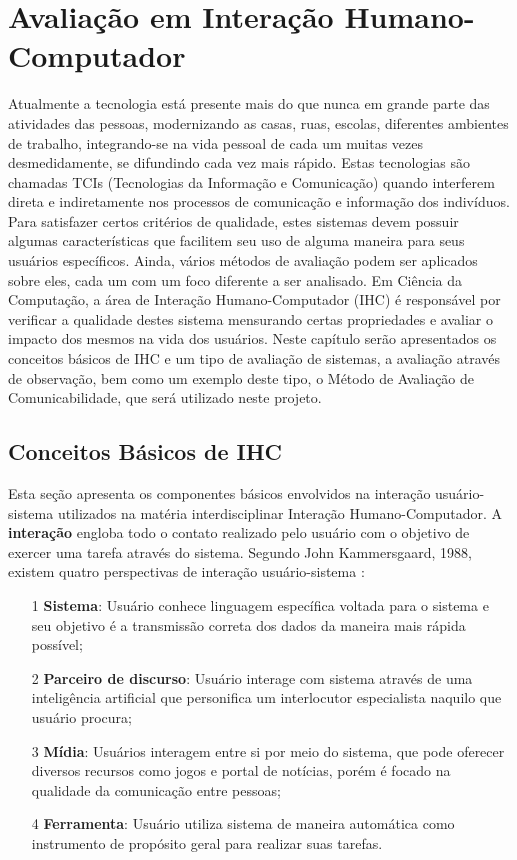 \chapter{Avaliação em Interação Humano-Computador}

\indent Atualmente a tecnologia está presente mais do que nunca em grande parte das atividades das pessoas, modernizando as casas, ruas, escolas, diferentes ambientes de trabalho, integrando-se na vida pessoal de cada um muitas vezes desmedidamente, se difundindo cada vez mais rápido. Estas tecnologias são chamadas TCIs (Tecnologias da Informação e Comunicação) quando interferem direta e indiretamente nos processos de comunicação e informação dos indivíduos. Para satisfazer certos critérios de qualidade, estes sistemas devem possuir algumas características que facilitem seu uso de alguma maneira para seus usuários específicos. Ainda, vários métodos de avaliação podem ser aplicados sobre eles, cada um com um foco diferente a ser analisado. Em Ciência da Computação, a área de Interação Humano-Computador (IHC) é responsável por verificar a qualidade destes sistema mensurando certas propriedades e avaliar o impacto dos mesmos na vida dos usuários. Neste capítulo serão apresentados os conceitos básicos de IHC e um tipo de avaliação de sistemas, a avaliação através de observação, bem como um exemplo deste tipo, o Método de Avaliação de Comunicabilidade, que será utilizado neste projeto.
 
\section{Conceitos Básicos de IHC} \label{cbIHC}

\indent Esta seção apresenta os componentes básicos envolvidos na interação usuário-sistema utilizados na matéria interdisciplinar Interação Humano-Computador. A \textbf{interação} engloba todo o contato realizado pelo usuário com o objetivo de exercer uma tarefa através do sistema. Segundo John Kammersgaard, 1988, existem quatro perspectivas de interação usuário-sistema \cite[p. 21]{IHCbook}:
\begin{itemize}
\item[1] \textbf{Sistema}: Usuário conhece linguagem específica voltada para o sistema e seu objetivo é a transmissão correta dos dados da maneira mais rápida possível;
\item[2] \textbf{Parceiro de discurso}: Usuário interage com sistema através de uma inteligência artificial que personifica um interlocutor especialista naquilo que usuário procura;
\item[3] \textbf{Mídia}: Usuários interagem entre si por meio do sistema, que pode oferecer diversos recursos como jogos e portal de notícias, porém é focado na qualidade da comunicação entre pessoas;
\item[4] \textbf{Ferramenta}: Usuário utiliza sistema de maneira automática como instrumento de propósito geral para realizar suas tarefas. 
\end{itemize}

